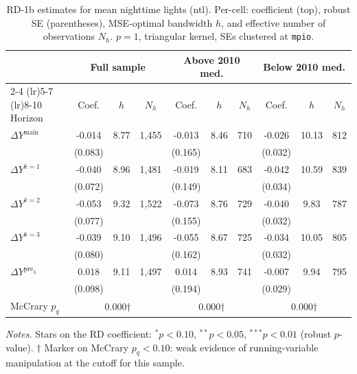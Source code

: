 \documentclass[11pt]{article}
\begin{document}
\begin{table}[H]
\centering
\scriptsize
\caption{RD-1b estimates for mean nighttime lights (ntl). Per-cell: coefficient
(top), robust SE (parentheses), MSE-optimal bandwidth $h$, and
effective number of observations $N_h$. $p=1$, triangular kernel,
SEs clustered at \texttt{mpio}.}
\label{tab:rdplot_rd1b_mean_night}
\begin{tabular}{l ccc ccc ccc}
\toprule
 & \multicolumn{3}{c}{Full sample} & \multicolumn{3}{c}{Above 2010 med.} & \multicolumn{3}{c}{Below 2010 med.} \\
\cmidrule(lr){2-4} \cmidrule(lr){5-7} \cmidrule(lr){8-10}
Horizon & Coef. & $h$ & $N_h$ & Coef. & $h$ & $N_h$ & Coef. & $h$ & $N_h$ \\
\midrule
$\Delta Y^{\text{main}}$ & -0.014 & 8.77 & 1,455 & -0.013 & 8.46 & 710 & -0.026 & 10.13 & 812 \\
 & (0.083) &  &  & (0.165) &  &  & (0.032) &  &  \\
\addlinespace[1pt]
$\Delta Y^{k=1}$ & -0.040 & 8.96 & 1,481 & -0.019 & 8.11 & 683 & -0.042 & 10.59 & 839 \\
 & (0.072) &  &  & (0.149) &  &  & (0.034) &  &  \\
\addlinespace[1pt]
$\Delta Y^{k=2}$ & -0.053 & 9.32 & 1,522 & -0.073 & 8.76 & 729 & -0.040 & 9.83 & 787 \\
 & (0.077) &  &  & (0.155) &  &  & (0.032) &  &  \\
\addlinespace[1pt]
$\Delta Y^{k=3}$ & -0.039 & 9.10 & 1,496 & -0.055 & 8.67 & 725 & -0.034 & 10.05 & 805 \\
 & (0.080) &  &  & (0.162) &  &  & (0.032) &  &  \\
\addlinespace[1pt]
$\Delta Y^{\text{pre}_3}$ & 0.018 & 9.11 & 1,497 & 0.014 & 8.93 & 741 & -0.007 & 9.94 & 795 \\
 & (0.098) &  &  & (0.194) &  &  & (0.029) &  &  \\
\addlinespace[1pt]
\midrule
McCrary $p_q$ & \multicolumn{3}{c}{0.000$\dagger$} & \multicolumn{3}{c}{0.000$\dagger$} & \multicolumn{3}{c}{0.000$\dagger$} \\
\bottomrule
\end{tabular}
\begin{flushleft}\footnotesize
\textit{Notes.} Stars on the RD coefficient: $^{*}p<0.10$,
$^{**}p<0.05$, $^{***}p<0.01$ (robust $p$-value).
$\dagger$ Marker on McCrary $p_q<0.10$: weak evidence of running-variable manipulation at the cutoff for this sample.\\
\end{flushleft}
\end{table}
\end{document}
